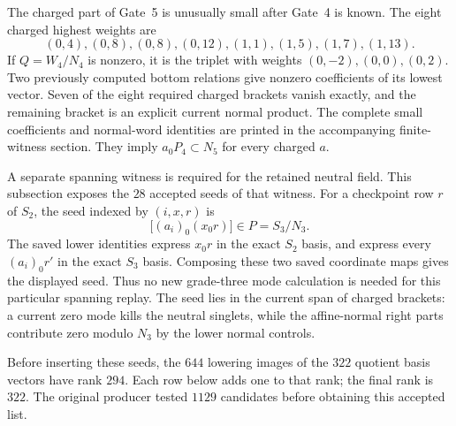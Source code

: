 The charged part of Gate~5 is unusually small after Gate~4 is known.
The eight charged highest weights are
\[
(0,4),(0,8),(0,8),(0,12),(1,1),(1,5),(1,7),(1,13).
\]
If $Q=W_4/N_4$ is nonzero, it is the triplet with weights
$(0,-2),(0,0),(0,2)$. Two previously computed bottom relations give
nonzero coefficients of its lowest vector. Seven of the eight required
charged brackets vanish exactly, and the remaining bracket is an
explicit current normal product. The complete small coefficients and
normal-word identities are printed in the accompanying finite-witness
section. They imply $a_0P_4\subset N_5$ for every charged $a$.

A separate spanning witness is required for the retained neutral field.
This subsection exposes the $28$ accepted seeds of that witness.
For a checkpoint row $r$ of $S_2$, the seed indexed by $(i,x,r)$ is
\[
       \bigl[(a_i)_0(x_0r)\bigr]\in P=S_3/N_3.
\]
The saved lower identities express $x_0r$ in the exact $S_2$ basis,
and express every $(a_i)_0r'$ in the exact $S_3$ basis. Composing
these two saved coordinate maps gives the displayed seed. Thus no new
grade-three mode calculation is needed for this particular spanning
replay. The seed lies in the current span of charged brackets: a
current zero mode kills the neutral singlets, while the affine-normal
right parts contribute zero modulo $N_3$ by the lower normal controls.

Before inserting these seeds, the $644$ lowering images of the $322$
quotient basis vectors have rank $294$. Each row below adds one to
that rank; the final rank is $322$. The original producer tested
$1129$ candidates before obtaining this accepted list.

